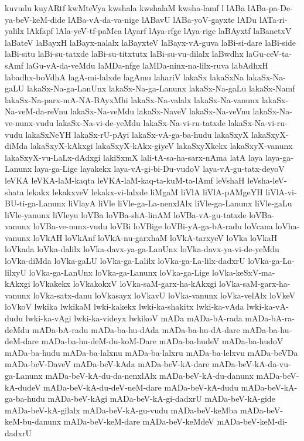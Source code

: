 {kuvudu
kuyARtf
kwMteVya
kwshala
kwshalaM
kwsha-lamf
l
lABa
lABa-pa-De-ya-beV-keM-dide
lABa-vA-da-va-nige
lABavU
lABa-yoV-gayxte
lADu
lATa-ri-yalilx
lAkfapf
lAla-yeV-tf-paMca
lAyarf
lAya-rfge
lAya-rige
laBAyxtf
laBanetxV
laBateV
laBayxH
laBayx-nalalx
laBayxteV
laBayx-vA-guva
laBi-si-dare
laBi-side
laBi-situ
laBi-su-tatxde
laBi-su-titxtutx
laBi-su-vu-dilalx
laBwdhx
laGu-ceV-ta-sAmf
laGu-vA-da-veMdu
laMDa-nfge
laMDa-ninx-na-lilx-ruva
labAdhxH
labadhx-boVdhA
lagA-mi-lalxde
lagAmu
lahariV
lakaSx
lakaSxNa
lakaSx-Na-gaLU
lakaSx-Na-ga-LanUnx
lakaSx-Na-ga-Lanunx
lakaSx-Na-gaLu
lakaSx-Namf
lakaSx-Na-parx-mA-NA-BAyxMhi
lakaSx-Na-valalx
lakaSx-Na-vanunx
lakaSx-Na-veM-da-reVnu
lakaSx-Na-veMdu
lakaSx-NaveV
lakaSx-Na-veVnu
lakaSx-Na-ve-nunx-vudu
lakaSx-Na-vi-de-yeMdu
lakaSx-Na-vi-ru-tatxde
lakaSx-Na-vi-ru-vudu
lakaSxNeYH
lakaSx-rU-pAyi
lakaSx-vA-ga-ba-hudu
lakaSxyX
lakaSxyX-diMda
lakaSxyX-kAkxgi
lakaSxyX-kAkx-giyeV
lakaSxyXkekx
lakaSxyX-vanunx
lakaSxyX-vu-LaLx-dAdxgi
lakiSxmX
lali-tA-sa-ha-sarx-nAma
latA
laya
laya-ga-Lanunx
laya-ga-Lige
layakekx
laya-vA-gi-bi-Du-vudoV
laya-vA-gu-tatx-deyoV
leVKA
leVKA-laM-kaqta
leVKA-laM-kaq-ta-kuM-ta-lAmf
leVshaH
leVsha-leV-shata
lekakx
lekakxveV
lekakx-vi-lalxde
liMgaM
liVlA
liVlA-pAMgeYH
liVlA-vi-BU-ti-ga-Lanunx
liVlayA
liVle
liVle-ga-La-nenxlAlx
liVle-ga-Lanunx
liVle-gaLu
liVle-yanunx
liVleyu
loVBa
loVBa-shA-linAM
loVBa-vA-gu-tatxde
loVBa-vanunx
loVBa-ve-nunx-vudu
loVBi
loVBige
loVBi-yA-ga-bA-radu
loVcana
loVha-vanunx
loVkAH
loVkAnf
loVkA-nu-garxhaM
loVkA-tarxyeV
loVka
loVkaH
loVkada
loVka-dalilx
loVka-davx-ya-ga-LanUnx
loVka-davx-ya-vi-de-yeMdu
loVka-diMda
loVka-gaLU
loVka-ga-Lalilx
loVka-ga-La-lilx-dadxrU
loVka-ga-La-lilxyU
loVka-ga-LanUnx
loVka-ga-Lanunx
loVka-ga-Lige
loVka-keSxV-ma-kAkxgi
loVkakekx
loVkakokxV
loVka-saM-garx-ha-kAkxgi
loVka-saM-garx-ha-vanunx
loVka-satx-danu
loVkasayx
loVkavU
loVka-vanunx
loVka-velAlx
loVkeV
loVkoV
lwkika
lwkikaM
lwki-kakekx
lwki-ka-shakitx
lwki-ka-vAda
lwki-ka-vA-dudu
lwki-ka-vAgi
lwki-ka-videyx
lwkikoV
mADa
mADa-bA-rada
mADa-bA-ra-deMdu
mADa-bA-radu
mADa-ba-hu-dAda
mADa-ba-hu-dA-dare
mADa-ba-hu-deM-dare
mADa-ba-hu-deM-du-koM-Dare
mADa-ba-hudeV
mADa-ba-hudoV
mADa-ba-hudu
mADa-ba-lalxnu
mADa-ba-lalxru
mADa-ba-lelxvu
mADa-beVDa
mADa-beV-DaveV
mADa-beV-kAda
mADa-beV-kA-dare
mADa-beV-kA-da-vu-ga-Lanunx
mADa-beV-kA-du-da-nenxlAlx
mADa-beV-kA-du-danunx
mADa-beV-kA-dudeV
mADa-beV-kA-du-deV-neM-dare
mADa-beV-kA-dudu
mADa-beV-kA-ga-ba-hudu
mADa-beV-kAgi
mADa-beV-kA-gi-dadxrU
mADa-beV-kA-gide
mADa-beV-kA-gilalx
mADa-beV-kA-gu-vudu
mADa-beV-keMba
mADa-beV-keM-bu-danunx
mADa-beV-keM-dare
mADa-beV-keMdeV
mADa-beV-keM-di-dadxrU
}
